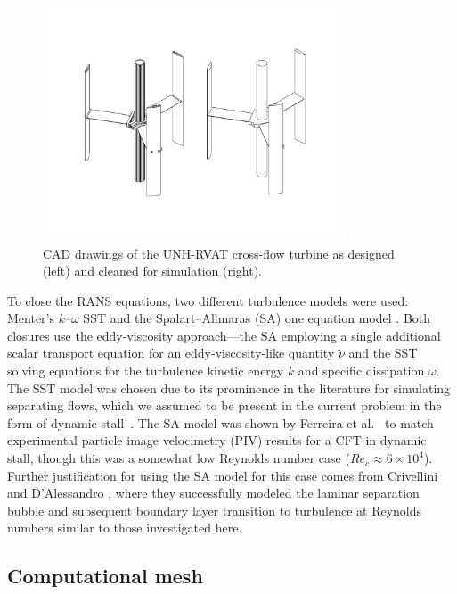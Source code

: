 \documentclass[aip,graphicx]{revtex4-1}
\begin{document}
\begin{figure}
    \centering

    \includegraphics[clip, trim=0 1in 0 1in, width=0.8\textwidth]{CAD}

    \caption{CAD drawings of the UNH-RVAT cross-flow turbine as designed (left)
        and cleaned for simulation (right).}

    \label{fig:cfd-cad}
\end{figure}

To close the RANS equations, two different turbulence models were used: Menter's
$k$--$\omega$ SST \cite{Menter1994} and the Spalart--Allmaras (SA) one equation
model \cite{Spalart1992}. Both closures use the eddy-viscosity approach---the SA
employing a single additional scalar transport equation for an
eddy-viscosity-like quantity $\tilde{\nu}$ and the SST solving equations for the
turbulence kinetic energy $k$ and specific dissipation $\omega$. The SST model
was chosen due to its prominence in the literature for simulating separating
flows, which we assumed to be present in the current problem in the form of
dynamic stall~\cite{Para2002}. The SA model was shown by Ferreira et
al.~\cite{Ferreira2007} to match experimental particle image velocimetry (PIV)
results for a CFT in dynamic stall, though this was a somewhat low Reynolds
number case ($Re_c \approx 6 \times 10^4$). Further justification for using the
SA model for this case comes from Crivellini and D'Alessandro
\cite{Crivellini2014}, where they successfully modeled the laminar separation
bubble and subsequent boundary layer transition to turbulence at Reynolds
numbers similar to those investigated here.


\subsection{Computational mesh}
\end{document}
